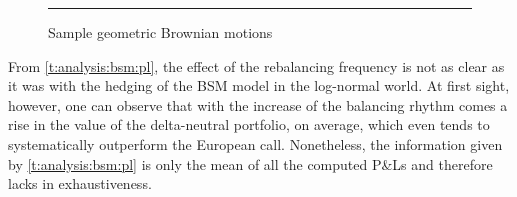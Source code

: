 \documentclass[12pt]{report}
\begin{document}
\begin{figure}[h]
  \centering
  \rule{40mm}{20mm}
  \caption{Sample geometric Brownian motions}
  \label{p:analysis:mjd:100}
\end{figure}






From \cref{t:analysis:bsm:pl}, the effect of the rebalancing frequency is not as clear as it was with the hedging of the BSM model in the log-normal world.
At first sight, however, one can observe that with the increase of the balancing rhythm comes a rise in the value of the delta-neutral portfolio, on average, which even tends to systematically outperform the European call.
Nonetheless, the information given by \cref{t:analysis:bsm:pl} is only the mean of all the computed P\&Ls and therefore lacks in exhaustiveness.
\end{document}
